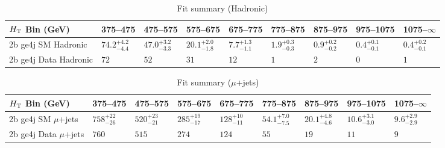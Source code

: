 \documentclass[8pt]{article}
\def\scalht{\mbox{$H_{\rm{T}}$}\xspace}
\newcommand\T{\rule{0pt}{2.6ex}}
\begin{document}
\begin{table}[ht!]
\caption{Fit summary (Hadronic)}
\label{tab:ensemble-summary}
\centering
\begin{tabular}{ lllllllll }

\hline
\scalht Bin (GeV)       & 375--475                       & 475--575                       & 575--675                       & 675--775                       & 775--875                       & 875--975                       & 975--1075                      & 1075--$\infty$                 \\ [1.000000ex]
\hline
2b ge4j SM Hadronic\T   & $74.2^{+4.2}_{-4.4}$           & $47.0^{+3.2}_{-3.3}$           & $20.1^{+2.0}_{-1.8}$           & $7.7^{+1.3}_{-1.1}$            & $1.9^{+0.3}_{-0.3}$            & $0.9^{+0.2}_{-0.2}$            & $0.4^{+0.1}_{-0.1}$            & $0.4^{+0.2}_{-0.1}$            \\ 
2b ge4j Data Hadronic\T & $72$                           & $52$                           & $31$                           & $12$                           & $1$                            & $2$                            & $0$                            & $1$                            \\ 
\hline

\end{tabular}
\end{table}
\begin{table}[ht!]
\caption{Fit summary ($\mu$+jets)}
\label{tab:ensemble-summary}
\centering
\begin{tabular}{ lllllllll }

\hline
\scalht Bin (GeV)       & 375--475                       & 475--575                       & 575--675                       & 675--775                       & 775--875                       & 875--975                       & 975--1075                      & 1075--$\infty$                 \\ [1.000000ex]
\hline
2b ge4j SM $\mu$+jets\T & $758^{+22}_{-26}$              & $520^{+23}_{-21}$              & $285^{+19}_{-17}$              & $128^{+10}_{-11}$              & $54.1^{+7.0}_{-7.5}$           & $20.1^{+4.8}_{-4.6}$           & $10.6^{+3.1}_{-3.0}$           & $9.6^{+2.9}_{-2.9}$            \\ 
2b ge4j Data $\mu$+jets\T & $760$                          & $515$                          & $274$                          & $124$                          & $55$                           & $19$                           & $11$                           & $9$                            \\ 
\hline

\end{tabular}
\end{table}
\end{document}

